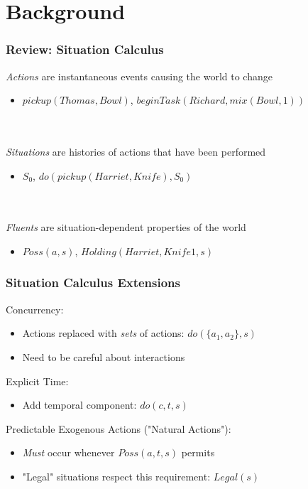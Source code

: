 \documentclass[compress]{beamer}
\begin{document}
\section{Background}

\begin{frame}
\frametitle{Review: Situation Calculus}
\emph{Actions} are instantaneous events causing the world to change
\begin{itemize}
  \item $pickup(Thomas,Bowl)$, $beginTask(Richard,mix(Bowl,1))$
\end{itemize}
\ \\
\ \\
\emph{Situations} are histories of actions that have been performed
\begin{itemize}
  \item $S_0$, $do(pickup(Harriet,Knife),S_0)$
\end{itemize}
\ \\
\ \\
\emph{Fluents} are situation-dependent properties of the world
\begin{itemize}
  \item $Poss(a,s)$, $Holding(Harriet,Knife1,s)$
\end{itemize}
\end{frame}

\begin{frame}
\frametitle{Situation Calculus Extensions}
Concurrency:
\begin{itemize}
  \item Actions replaced with \emph{sets} of actions: $do(\{a_1,a_2\},s)$
  \item Need to be careful about interactions
\end{itemize}
Explicit Time:
\begin{itemize}
  \item Add temporal component: $do(c,t,s)$
\end{itemize}
Predictable Exogenous Actions ("Natural Actions"):
\begin{itemize}
  \item \emph{Must} occur whenever $Poss(a,t,s)$ permits
  \item "Legal" situations respect this requirement: $Legal(s)$
\end{itemize}
\end{frame}
\end{document}
